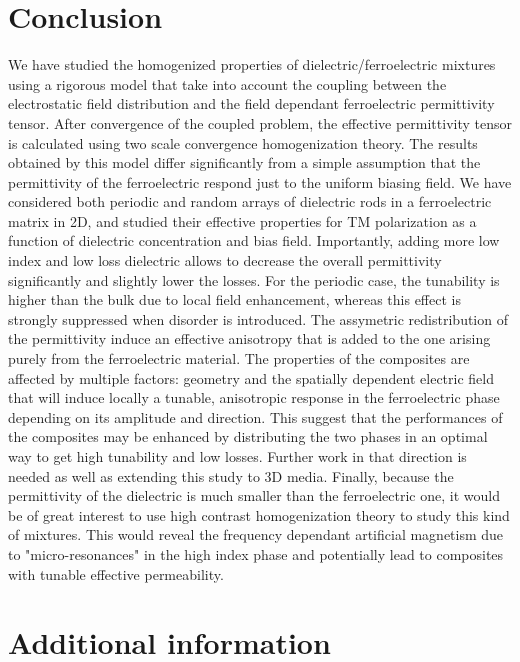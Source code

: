 \documentclass[%
 aip,
 amsmath,amssymb,
 reprint,%
]{revtex4-1}
\begin{document}
%

\section{Conclusion}

We have studied the homogenized properties of dielectric/ferroelectric mixtures
using a rigorous model that take into account the coupling between the electrostatic
field distribution and the field dependant ferroelectric permittivity tensor. After
convergence of the coupled problem, the effective permittivity tensor is calculated using
two scale convergence homogenization theory.
The results obtained by this model differ significantly from a simple assumption that
the permittivity of the ferroelectric respond just to the uniform biasing field.
We have considered both periodic and random arrays
of dielectric rods in a ferroelectric matrix in 2D, and studied their effective properties
for TM polarization as a function of dielectric concentration and bias field.
Importantly, adding more low index and low loss dielectric allows to decrease
the overall permittivity significantly and slightly lower the losses.
For the periodic case, the tunability is higher than the bulk due to local field enhancement, whereas
this effect is strongly suppressed when disorder is introduced. The assymetric redistribution of the permittivity
induce an effective anisotropy that is added to the one arising purely from the ferroelectric material.
The properties of the composites are affected by multiple factors:
geometry and the spatially dependent electric field that will induce locally a tunable, anisotropic
response in the ferroelectric phase depending on its amplitude and direction.
This suggest that the performances of the composites
may be enhanced by distributing the two phases in an optimal way to get high
tunability and low losses. Further work in that direction is needed as well as
extending this study to 3D media.
Finally, because the permittivity of the dielectric is much smaller than the ferroelectric one,
it would be of great interest to use high contrast homogenization theory
\cite{bouchitte_homogenization_2004, cherednichenko_homogenization_2015} to
study this kind of mixtures.
This would reveal the frequency dependant artificial magnetism due to "micro-resonances"
in the high index phase and potentially lead to composites with tunable effective permeability.

\section*{Additional information}
\end{document}
